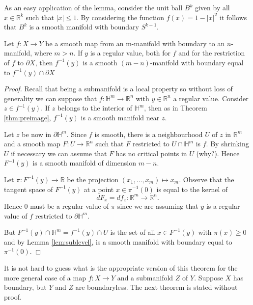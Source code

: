 As an easy application of the lemma, consider the unit ball $B^{k}$ given by all $x \in \mathbb{R}^{k}$ such that $|x| \leq 1$. By considering the function $f(x)=1-|x|^{2}$ it follows that $B^{k}$ is a smooth manifold with boundary $S^{k-1}$.

\begin{theorem}
    Let $f: X \rightarrow Y$ be a smooth map from an m-manifold with boundary to an $n$-manifold, where $m>n$. If $y$ is a regular value, both for $f$ and for the restriction of $f$ to $\partial X$, then $f^{-1}(y)$ is a smooth $(m-n)$-manifold with boundary equal to $f^{-1}(y) \cap \partial X$
\end{theorem}
\begin{proof}
    Recall that being a submanifold is a local property so without loss of generality we can suppose that $f: \mathbb{H}^{m} \rightarrow \mathbb{R}^{n}$ with $y \in \mathbb{R}^{n}$ a regular value. Consider $z \in f^{-1}(y)$. If $z$ belongs to the interior of $\mathbb{H}^{m}$, then as in Theorem \ref{thm:preimage}, $f^{-1}(y)$ is a smooth manifold near $z$.

Let $z$ be now in $\partial \mathbb{H}^{m}$. Since $f$ is smooth, there is a neighbourhood $U$ of $z$ in $\mathbb{R}^{m}$ and a smooth map $F: U \rightarrow \mathbb{R}^{n}$ such that $F$ restricted to $U \cap \mathbb{H}^{m}$ is $f$. By shrinking $U$ if necessary we can assume that $F$ has no critical points in $U$ (why?). Hence $F^{-1}(y)$ is a smooth manifold of dimension $m-n$.

Let $\pi: F^{-1}(y) \rightarrow \mathbb{R}$ be the projection $\left(x_{1}, \ldots, x_{m}\right) \mapsto x_{m}$. Observe that the tangent space of $F^{-1}(y)$ at a point $x \in \pi^{-1}(0)$ is equal to the kernel of
$$
d F_{x}=d f_{x}: \mathbb{R}^{m} \rightarrow \mathbb{R}^{n}.
$$
Hence 0 must be a regular value of $\pi$ since we are assuming that $y$ is a regular value of $f$ restricted to $\partial \mathbb{H}^{m}$.

But $F^{-1}(y) \cap \mathbb{H}^{m}=f^{-1}(y) \cap U$ is the set of all $x \in F^{-1}(y)$ with $\pi(x) \geq 0$ and by Lemma \ref{lem:sublevel}, is a smooth manifold with boundary equal to $\pi^{-1}(0)$.
\end{proof}

It is not hard to guess what is the appropriate version of this theorem for the more general case of a map $f: X \rightarrow Y$ and a submanifold $Z$ of $Y$. Suppose $X$ has boundary, but $Y$ and $Z$ are boundaryless. The next theorem is stated without proof.

